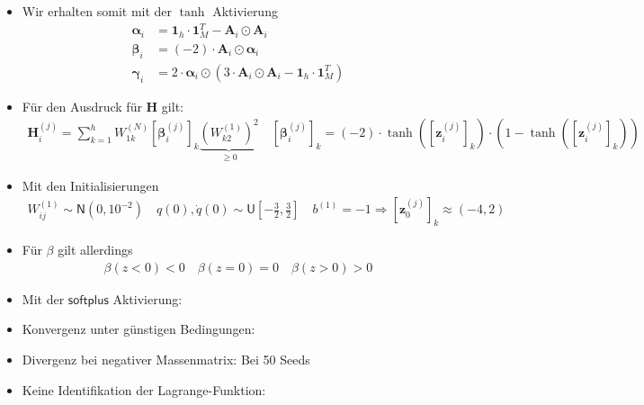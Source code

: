 \documentclass[a4paper, 12pt]{scrartcl}
\begin{document}
\begin{itemize}
    \item Wir erhalten somit mit der $\tanh$ Aktivierung
    \begin{align*}
        \bm{\alpha}_i &= \bm{1}_h \cdot \bm{1}_M^T  - \bm{A}_i \odot \bm{A}_i \\
        \bm{\beta}_i &= (-2) \cdot \bm{A}_i \odot \bm{\alpha}_i  \\
        \bm{\gamma}_i &= 2 \cdot \bm{\alpha}_i \odot \left(3 \cdot \bm{A}_i \odot \bm{A}_i - \bm{1}_h \cdot \bm{1}_M^T\right)
    \end{align*}
    \item Für den Ausdruck für $\bm{H}$ gilt:
    \begin{align*}
        \bm{H}_i^{(j)} =
        \sum_{k=1}^{h} W_{1k}^{(N)} \left[\bm{\beta}_i^{(j)}\right]_k 
        \underbrace{
            \left(W_{k2}^{(1)}\right)^2
        }_{\geq 0} 
        \quad
        \left[\bm{\beta}_i^{(j)}\right]_k = (-2) \cdot \tanh\left(\left[\bm{z}_i^{(j)}\right]_k \right) 
        \cdot \left(1 - \tanh\left(\left[\bm{z}_i^{(j)}\right]_k \right)\right) 
    \end{align*}
    \item Mit den Initialisierungen
    \begin{align*}
        W^{(1)}_{ij} \sim \mathsf{N}\left(0, 10^{-2} \right) 
        \quad
        q(0),\dot{q}(0) \sim \mathsf{U}\left[-\frac{3}{2}, \frac{3}{2}\right]
        \quad
        b^{(1)} = -1 
        \Rightarrow
        \left[\bm{z}_0^{(j)}\right]_k
        \approx \left(-4,2\right)
    \end{align*}
    \item Für $\beta$ gilt allerdings
    \begin{align}
        \beta(z<0) < 0  \quad \beta(z=0) = 0 \quad \beta(z > 0) > 0
    \end{align}
    \item Mit der $\mathsf{softplus}$ Aktivierung:
\end{itemize}


\begin{itemize}
    \item Konvergenz unter günstigen Bedingungen: 
    \item Divergenz bei negativer Massenmatrix: Bei 50 Seeds 
    \item Keine Identifikation der Lagrange-Funktion:
\end{itemize}
\end{document}
